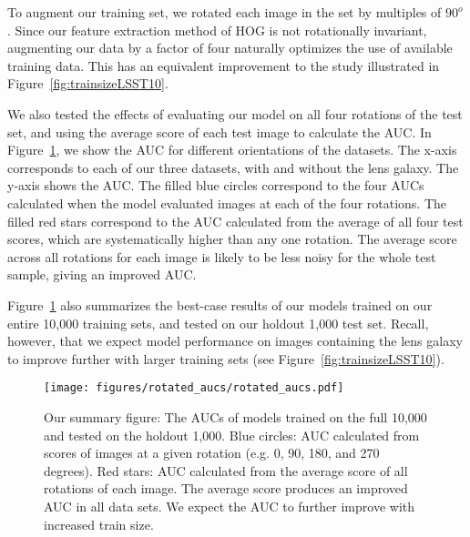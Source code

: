 \documentclass{emulateapj}
\begin{document}
To augment our training set, we rotated each image in the set by
multiples of $90^o$.  Since our feature extraction method of HOG is
not rotationally invariant, augmenting our data by a factor of four
naturally optimizes the use of available training data.  This has an
equivalent improvement to the study illustrated in
Figure~\ref{fig:trainsizeLSST10}.

We also tested the effects of evaluating our model on all four
rotations of the test set, and using the average score of each test
image to calculate the AUC.  In Figure~\ref{fig:rotation_test}, we
show the AUC for different orientations of the datasets.  The x-axis
corresponds to each of our three datasets, with and without the lens
galaxy.  The y-axis shows the AUC.  The filled blue circles correspond
to the four AUCs calculated when the model evaluated images at each of
the four rotations.  The filled red stars correspond to the AUC
calculated from the average of all four test scores, which are
systematically higher than any one rotation.  The average score across
all rotations for each image is likely to be less noisy for the whole
test sample, giving an improved AUC.

Figure~\ref{fig:rotation_test} also summarizes the best-case results
of our models trained on our entire 10,000 training sets, and tested
on our holdout 1,000 test set.  Recall, however, that we expect model
performance on images containing the lens galaxy to improve further
with larger training sets (see Figure~\ref{fig:trainsizeLSST10}).

\begin{figure}[t]
\begin{center}
\texttt{[image: figures/rotated\_aucs/rotated\_aucs.pdf]}
\caption{Our summary figure: The AUCs of models trained on the full
  10,000 and tested on the holdout 1,000.  Blue circles: AUC
  calculated from scores of images at a given rotation (e.g. 0, 90,
  180, and 270 degrees).  Red stars: AUC calculated from the average
  score of all rotations of each image.  The average score produces an
  improved AUC in all data sets.  We expect the AUC to further improve
  with increased train size.}\label{fig:rotation_test}
\end{center}
\end{figure}
\end{document}
